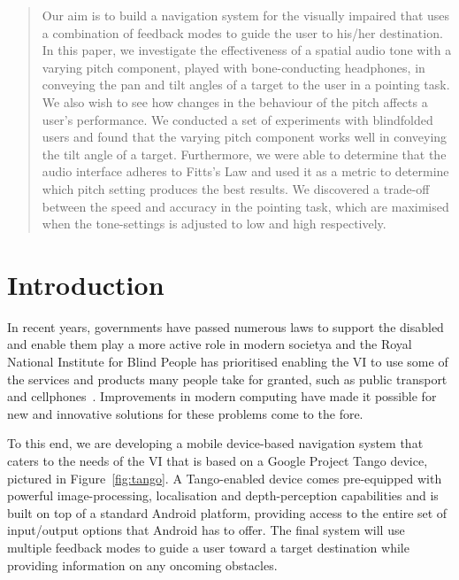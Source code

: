 \documentclass[format=sigconf, review=true, screen=true, anonymous=true]{acmart}
\begin{document}

\begin{abstract}
	Our aim is to build a navigation system for the visually impaired that uses a combination of feedback modes to guide the user to his/her destination. In this paper, we investigate the effectiveness of a spatial audio tone with a varying pitch component, played with bone-conducting headphones, in conveying the pan and tilt angles of a target to the user in a pointing task. We also wish to see how changes in the behaviour of the pitch affects a user's performance. We conducted a set of experiments with blindfolded users and found that the varying pitch component works well in conveying the tilt angle of a target. Furthermore, we were able to determine that the audio interface adheres to Fitts's Law and used it as a metric to determine which pitch setting produces the best results. We discovered a trade-off between the speed and accuracy in the pointing task, which are maximised when the tone-settings is adjusted to low and high respectively. 
\end{abstract}

\maketitle

\section{Introduction}

In recent years, governments have passed numerous laws to support the disabled and enable them play a more active role in modern societya and the Royal National Institute for Blind People has prioritised enabling the VI to use some of the services and products many people take for granted, such as public transport and cellphones~\cite{rnib-objectives}. Improvements in modern computing have made it possible for new and innovative solutions for these problems come to the fore.

To this end, we are developing a mobile device-based navigation system that caters to the needs of the VI that is based on a Google Project Tango device, pictured in Figure~\ref{fig:tango}. A Tango-enabled device comes pre-equipped with powerful image-processing, localisation and depth-perception capabilities and is built on top of a standard Android platform, providing access to the entire set of input/output options that Android has to offer. The final system will use multiple feedback modes to guide a user toward a target destination while providing information on any oncoming obstacles.
\end{document}
